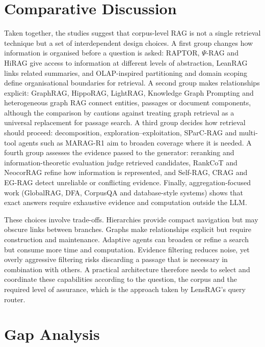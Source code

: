 \documentclass[11pt,letterpaper,oneside]{report}
\begin{document}
\section{Comparative Discussion}
\label{sec:synthesis}

Taken together, the studies suggest that corpus-level RAG is not a single
retrieval technique but a set of interdependent design choices. A first group
changes how information is organised before a question is asked: RAPTOR,
$\Psi$-RAG and HiRAG give access to information at different levels of
abstraction, LeanRAG links related summaries, and OLAP-inspired partitioning
and domain scoping define organisational boundaries for retrieval. A second
group makes relationships explicit: GraphRAG, HippoRAG, LightRAG, Knowledge
Graph Prompting and heterogeneous graph RAG connect entities, passages or
document components, although the comparison by \citet{han2026ragvsgraphrag}
cautions against treating graph retrieval as a universal replacement for
passage search. A third group decides how retrieval should proceed:
decomposition, exploration--exploitation, SParC-RAG and multi-tool agents such
as MARAG-R1 aim to broaden coverage where it is needed. A fourth group
assesses the evidence passed to the generator: reranking and
information-theoretic evaluation judge retrieved candidates, RankCoT and
NeocorRAG refine how information is represented, and Self-RAG, CRAG and
EG-RAG detect unreliable or conflicting evidence. Finally, aggregation-focused
work (GlobalRAG, DFA, CorpusQA and database-style systems) shows that exact
answers require exhaustive evidence and computation outside the LLM.

These choices involve trade-offs. Hierarchies provide compact navigation but
may obscure links between branches. Graphs make relationships explicit but
require construction and maintenance. Adaptive agents can broaden or refine a
search but consume more time and computation. Evidence filtering reduces
noise, yet overly aggressive filtering risks discarding a passage that is
necessary in combination with others. A practical architecture therefore
needs to select and coordinate these capabilities according to the question,
the corpus and the required level of assurance, which is the approach taken by
LensRAG's query router.

\section{Gap Analysis}
\label{sec:gap}
\end{document}
